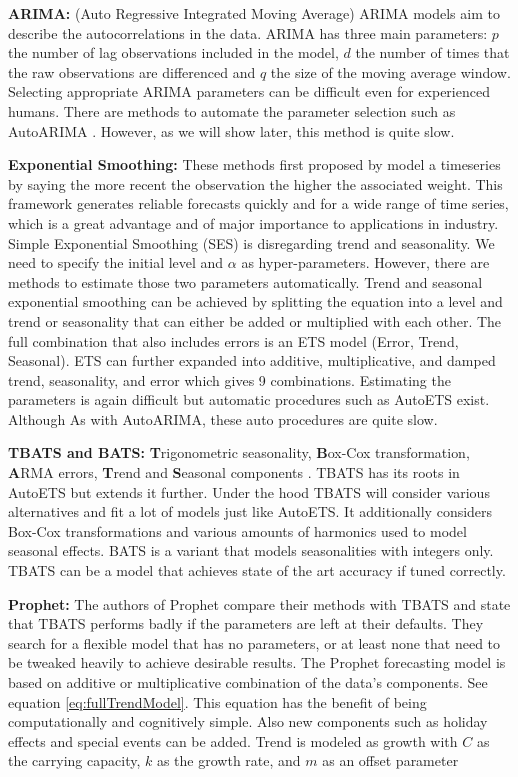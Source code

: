 \textbf{ARIMA:} (Auto Regressive Integrated Moving Average) \cite{ARIMA} ARIMA models aim to describe the autocorrelations in the data. ARIMA has three main parameters: $p$ the number of lag observations included in the model, $d$ the number of times that the raw observations are differenced and $q$ the size of the moving average window. Selecting appropriate ARIMA parameters can be difficult even for experienced humans. There are methods to automate the parameter selection such as AutoARIMA \cite{fpp3}. However, as we will show later, this method is quite slow.

\textbf{Exponential Smoothing:} These methods first proposed by \cite{HOLT} model a timeseries by saying the more recent the observation the higher the associated weight. This framework generates reliable forecasts quickly and for a wide range of time series, which is a great advantage and of major importance to applications in industry. Simple Exponential Smoothing (SES) is disregarding trend and seasonality. We need to specify the initial level and $\alpha$ as hyper-parameters. However, there are methods to estimate those two parameters automatically. Trend and seasonal exponential smoothing can be achieved by splitting the equation into a level and trend or seasonality that can either be added or multiplied with each other. The full combination that also includes errors is an ETS model (Error, Trend, Seasonal). ETS can further expanded into additive, multiplicative, and damped trend, seasonality, and error which gives 9 combinations. Estimating the parameters is again difficult but automatic procedures such as AutoETS exist. Although As with AutoARIMA, these auto procedures are quite slow.

\textbf{TBATS and BATS:} \textbf{T}rigonometric seasonality, \textbf{B}ox-Cox transformation, \textbf{A}RMA errors, \textbf{T}rend and \textbf{S}easonal components \cite{TBATS}. TBATS has its roots in AutoETS but extends it further. Under the hood TBATS will consider various alternatives and fit a lot of models just like AutoETS. It additionally considers Box-Cox transformations and various amounts of harmonics used to model seasonal effects. BATS is a variant that models seasonalities with integers only. TBATS can be a model that achieves state of the art accuracy if tuned correctly.

\textbf{Prophet:} The authors of Prophet \cite{prophet} compare their methods with TBATS and state that TBATS performs badly if the parameters are left at their defaults. They search for a flexible model that has no parameters, or at least none that need to be tweaked heavily to achieve desirable results. The Prophet forecasting model is based on additive or multiplicative combination of the data's components. See equation \ref{eq:fullTrendModel}. This equation has the benefit of being computationally and cognitively simple. Also new components such as holiday effects and special events can be added. Trend is modeled as growth with \(C\) as the carrying capacity, \(k\) as the growth rate, and \(m\) as an offset parameter

